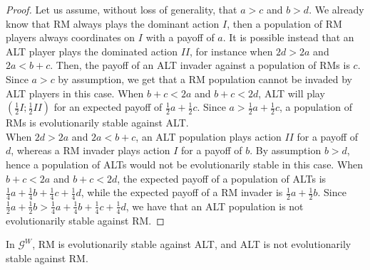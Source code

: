 \documentclass[fleqn,reqno,11pt]{article}
\begin{document}
\begin{proof}
Let us assume, without loss of generality, that $a>c$ and $b>d$. We already know that RM always plays the dominant action $I$, then a population of RM players always coordinates on $I$ with a payoff of $a$. It is possible instead that an ALT player plays the dominated action $II$, for instance when $2d > 2a$ and $2a < b+c$. Then, the payoff of an ALT invader against a population of RMs is $c$. Since $a>c$ by assumption, we get that a RM population cannot be invaded by ALT players in this case. When $b+c < 2a$ and $b+c < 2d$, ALT will play $(\frac{1}{2}I;\frac{1}{2}II)$ for an expected payoff of $\frac{1}{2} a + \frac{1}{2} c$. Since $a > \frac{1}{2} a + \frac{1}{2} c$, a population of RMs is evolutionarily stable against ALT. \\
When $2d > 2a$ and $2a < b+c$, an ALT population plays action $II$ for a payoff of $d$, whereas a RM invader plays action $I$ for a payoff of $b$. By assumption $b>d$, hence a population of ALTs would not be evolutionarily stable in this case. When $b+c < 2a$ and $b+c < 2d$, the expected payoff of a population of ALTs is $\frac{1}{4}a+\frac{1}{4}b+\frac{1}{4}c+\frac{1}{4}d$, while the expected payoff of a RM invader is $\frac{1}{2}a+\frac{1}{2}b$. Since $\frac{1}{2}a+\frac{1}{2}b > \frac{1}{4}a+\frac{1}{4}b+\frac{1}{4}c+\frac{1}{4}d$, we have that an ALT population is not evolutionarily stable against RM.
\end{proof}



\begin{lemma}
In $\mathcal{G}^W$, RM is evolutionarily stable against ALT, and ALT is not evolutionarily stable against RM. 
\end{lemma}
\end{document}
